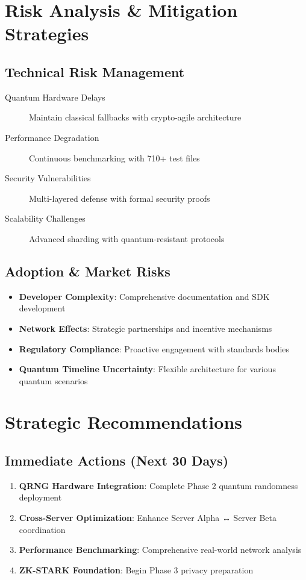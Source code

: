 \documentclass[11pt,a4paper]{article}
\begin{document}
\section{Risk Analysis \& Mitigation Strategies}

\subsection{Technical Risk Management}

\begin{description}
\item[Quantum Hardware Delays] Maintain classical fallbacks with crypto-agile architecture
\item[Performance Degradation] Continuous benchmarking with 710+ test files
\item[Security Vulnerabilities] Multi-layered defense with formal security proofs
\item[Scalability Challenges] Advanced sharding with quantum-resistant protocols
\end{description}

\subsection{Adoption \& Market Risks}

\begin{itemize}
\item \textbf{Developer Complexity}: Comprehensive documentation and SDK development
\item \textbf{Network Effects}: Strategic partnerships and incentive mechanisms
\item \textbf{Regulatory Compliance}: Proactive engagement with standards bodies
\item \textbf{Quantum Timeline Uncertainty}: Flexible architecture for various quantum scenarios
\end{itemize}

\section{Strategic Recommendations}

\subsection{Immediate Actions (Next 30 Days)}

\begin{enumerate}
\item \textbf{QRNG Hardware Integration}: Complete Phase 2 quantum randomness deployment
\item \textbf{Cross-Server Optimization}: Enhance Server Alpha ↔ Server Beta coordination
\item \textbf{Performance Benchmarking}: Comprehensive real-world network analysis
\item \textbf{ZK-STARK Foundation}: Begin Phase 3 privacy preparation
\end{enumerate}
\end{document}

